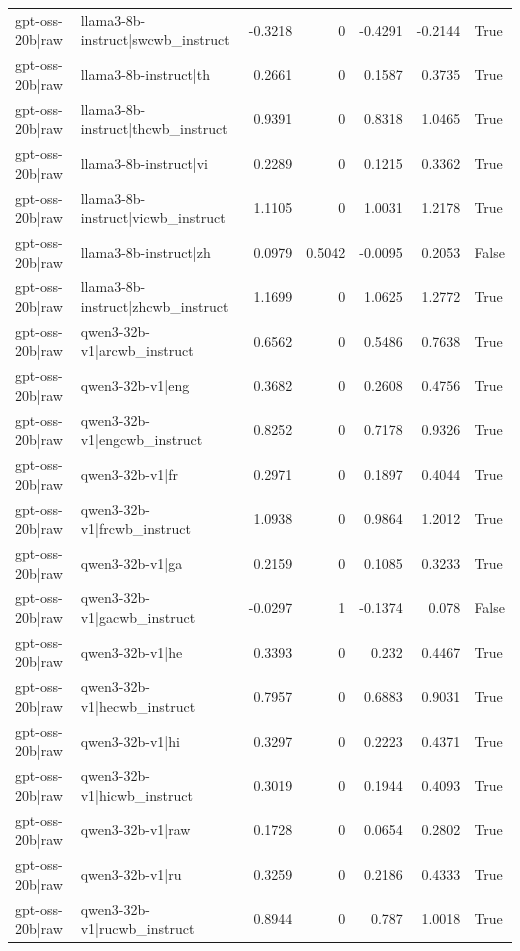 \begin{table}
\begin{tabular}{l l r r r r l}
gpt-oss-20b|raw & llama3-8b-instruct|swcwb_instruct & -0.3218 & 0 & -0.4291 & -0.2144 & True \\
gpt-oss-20b|raw & llama3-8b-instruct|th & 0.2661 & 0 & 0.1587 & 0.3735 & True \\
gpt-oss-20b|raw & llama3-8b-instruct|thcwb_instruct & 0.9391 & 0 & 0.8318 & 1.0465 & True \\
gpt-oss-20b|raw & llama3-8b-instruct|vi & 0.2289 & 0 & 0.1215 & 0.3362 & True \\
gpt-oss-20b|raw & llama3-8b-instruct|vicwb_instruct & 1.1105 & 0 & 1.0031 & 1.2178 & True \\
gpt-oss-20b|raw & llama3-8b-instruct|zh & 0.0979 & 0.5042 & -0.0095 & 0.2053 & False \\
gpt-oss-20b|raw & llama3-8b-instruct|zhcwb_instruct & 1.1699 & 0 & 1.0625 & 1.2772 & True \\
gpt-oss-20b|raw & qwen3-32b-v1|arcwb_instruct & 0.6562 & 0 & 0.5486 & 0.7638 & True \\
gpt-oss-20b|raw & qwen3-32b-v1|eng & 0.3682 & 0 & 0.2608 & 0.4756 & True \\
gpt-oss-20b|raw & qwen3-32b-v1|engcwb_instruct & 0.8252 & 0 & 0.7178 & 0.9326 & True \\
gpt-oss-20b|raw & qwen3-32b-v1|fr & 0.2971 & 0 & 0.1897 & 0.4044 & True \\
gpt-oss-20b|raw & qwen3-32b-v1|frcwb_instruct & 1.0938 & 0 & 0.9864 & 1.2012 & True \\
gpt-oss-20b|raw & qwen3-32b-v1|ga & 0.2159 & 0 & 0.1085 & 0.3233 & True \\
gpt-oss-20b|raw & qwen3-32b-v1|gacwb_instruct & -0.0297 & 1 & -0.1374 & 0.078 & False \\
gpt-oss-20b|raw & qwen3-32b-v1|he & 0.3393 & 0 & 0.232 & 0.4467 & True \\
gpt-oss-20b|raw & qwen3-32b-v1|hecwb_instruct & 0.7957 & 0 & 0.6883 & 0.9031 & True \\
gpt-oss-20b|raw & qwen3-32b-v1|hi & 0.3297 & 0 & 0.2223 & 0.4371 & True \\
gpt-oss-20b|raw & qwen3-32b-v1|hicwb_instruct & 0.3019 & 0 & 0.1944 & 0.4093 & True \\
gpt-oss-20b|raw & qwen3-32b-v1|raw & 0.1728 & 0 & 0.0654 & 0.2802 & True \\
gpt-oss-20b|raw & qwen3-32b-v1|ru & 0.3259 & 0 & 0.2186 & 0.4333 & True \\
gpt-oss-20b|raw & qwen3-32b-v1|rucwb_instruct & 0.8944 & 0 & 0.787 & 1.0018 & True \\

\end{tabular}
\end{table}
